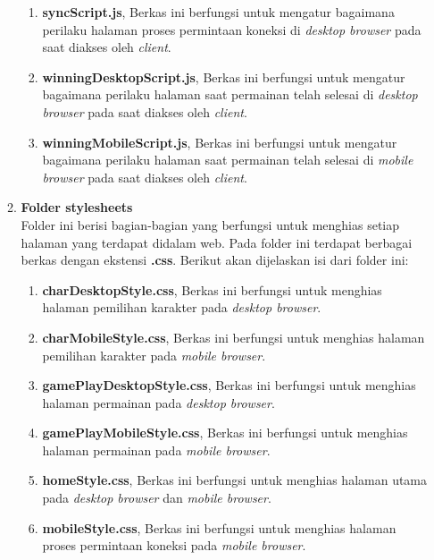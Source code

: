 \begin{enumerate}
\begin{enumerate}
\begin{enumerate}
			\item \textbf{syncScript.js}, Berkas ini berfungsi untuk mengatur bagaimana perilaku halaman proses permintaan koneksi di \textit{desktop browser} pada saat diakses oleh \textit{client}.
			
			\item \textbf{winningDesktopScript.js}, Berkas ini berfungsi untuk mengatur bagaimana perilaku halaman saat permainan telah selesai di \textit{desktop browser} pada saat diakses oleh \textit{client}.
			
			\item \textbf{winningMobileScript.js}, Berkas ini berfungsi untuk mengatur bagaimana perilaku halaman saat permainan telah selesai di \textit{mobile browser} pada saat diakses oleh \textit{client}.
			
		\end{enumerate}
		\item \textbf{Folder stylesheets} \\ 
		Folder ini berisi bagian-bagian yang berfungsi untuk menghias setiap halaman yang terdapat didalam web. Pada folder ini terdapat berbagai berkas dengan ekstensi \textbf{.css}. Berikut akan dijelaskan isi dari folder ini:
		
		\begin{enumerate}
			\item \textbf{charDesktopStyle.css}, Berkas ini berfungsi untuk menghias halaman pemilihan karakter pada \textit{desktop browser}.
			
			\item \textbf{charMobileStyle.css}, Berkas ini berfungsi untuk menghias halaman pemilihan karakter pada \textit{mobile browser}.
			
			\item \textbf{gamePlayDesktopStyle.css}, Berkas ini berfungsi untuk menghias halaman permainan pada \textit{desktop browser}.
			
			\item \textbf{gamePlayMobileStyle.css}, Berkas ini berfungsi untuk menghias halaman permainan pada \textit{mobile browser}.
			
			\item \textbf{homeStyle.css}, Berkas ini berfungsi untuk menghias halaman utama pada \textit{desktop browser} dan \textit{mobile browser}.
			
			\item \textbf{mobileStyle.css}, Berkas ini berfungsi untuk menghias halaman proses permintaan koneksi pada \textit{mobile browser}.
			

\end{enumerate}
\end{enumerate}
\end{enumerate}
